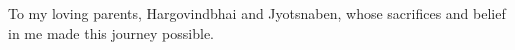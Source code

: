 \begin{center}
\vspace*{52pt}
To my loving parents, Hargovindbhai and Jyotsnaben, whose sacrifices and belief in me made this journey possible.
\end{center}
\pagebreak
